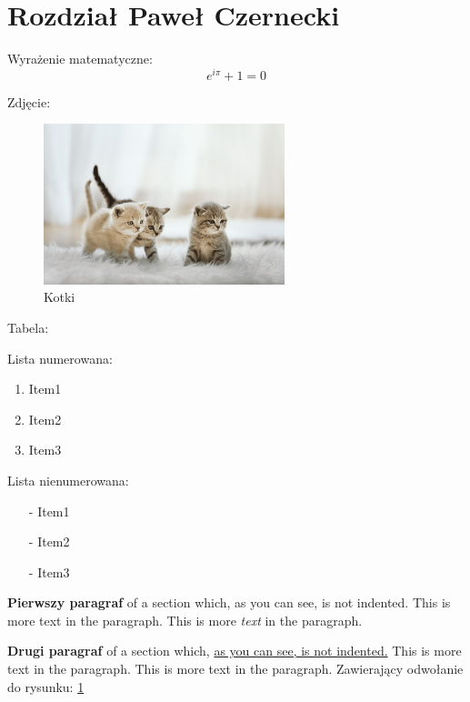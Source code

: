 \section{Rozdział Paweł Czernecki}

Wyrażenie matematyczne:
\[e^{i\pi}+1=0\]


Zdjęcie:
\begin{figure}[h!]
  \includegraphics[width=7cm]{pictures/1648545312.jpg}
  \caption{Kotki}
  \label{fig:cats}
\end{figure}


Tabela:\newline




Lista numerowana:
\begin{enumerate}
    \item Item1
    \item Item2
    \item Item3
\end{enumerate}


Lista nienumerowana:
\begin{itemize}
  \item[-] Item1
  \item[-] Item2
  \item[-] Item3
\end{itemize}

\textbf{Pierwszy paragraf} of a section which, as you can see, is not indented. This is more text in the paragraph. This is more \textit{text} in the paragraph.

\textbf{Drugi paragraf} of a section which, \underline{as you can see, is not indented.} This is more text in the paragraph. This is more text in the paragraph. Zawierający odwołanie do rysunku: \ref{fig:cats}